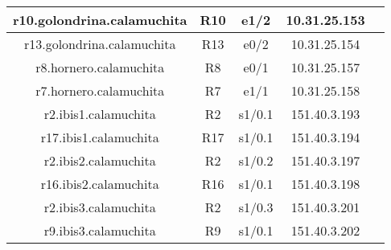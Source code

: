 \begin{tabular}{|c|c|c|c|c|}
	\hline
	r10.golondrina.calamuchita & R10 & e1/2 & 10.31.25.153 \\
	\hline
	r13.golondrina.calamuchita & R13 & e0/2 & 10.31.25.154 \\
	\hline

	\hline
	r8.hornero.calamuchita & R8 & e0/1 & 10.31.25.157 \\
	\hline
	r7.hornero.calamuchita & R7 & e1/1 & 10.31.25.158 \\
	\hline

	\hline
	r2.ibis1.calamuchita & R2 & s1/0.1 & 151.40.3.193 \\
	\hline
	r17.ibis1.calamuchita & R17 & s1/0.1 & 151.40.3.194 \\
	\hline

	\hline
	r2.ibis2.calamuchita & R2 & s1/0.2 & 151.40.3.197 \\
	\hline
	r16.ibis2.calamuchita & R16 & s1/0.1 & 151.40.3.198 \\
	\hline

	\hline
	r2.ibis3.calamuchita & R2 & s1/0.3 & 151.40.3.201 \\
	\hline
	r9.ibis3.calamuchita & R9 & s1/0.1 & 151.40.3.202 \\
	\hline
\end{tabular}
\newpage
